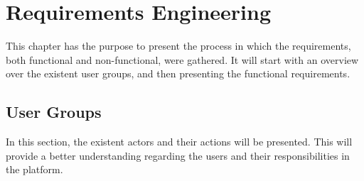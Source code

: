 \chapter{Requirements Engineering} %
\label{chap:Requirements_Engineering}
This chapter has the purpose to present the process in which the requirements, both functional and non-functional, were gathered. It will start with an overview over the existent user groups, and then presenting the functional requirements. 

\section{User Groups}
\label{sec:Requirements_userGroups}
In this section, the existent actors and their actions will be presented. This will provide a better understanding regarding the users and their responsibilities in the platform.
\par

